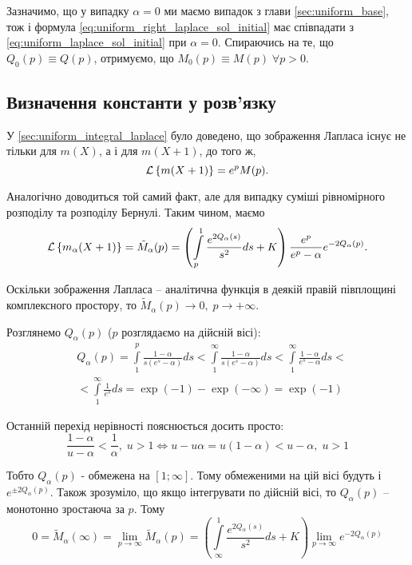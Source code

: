 Зазначимо, що у випадку $\alpha=0$ ми маємо випадок з глави \ref{sec:uniform_base}, тож і формула \eqref{eq:uniform_right_laplace_sol_initial} має співпадати з \eqref{eq:uniform_laplace_sol_initial} при $\alpha = 0$. Спираючись на те, що $Q_0(p) \equiv Q(p)$, отримуємо, що $M_0(p) \equiv M(p) \; \forall p > 0$.

\subsection{Визначення константи у розв'язку}

У \ref{sec:uniform_integral_laplace} було доведено, що зображення Лапласа існує не тільки для $m(X)$, а і для $m(X+1)$, до того ж,
\begin{equation}
	\mathcal{L}\left\{m(X+1)\right\} = e^p M(p).
\end{equation}

Аналогічно доводиться той самий факт, але для випадку суміші рівномірного розподілу та розподілу Бернулі. Таким чином, маємо
\begin{equation}
	\mathcal{L}\left\{m_\alpha(X+1)\right\} =\tilde M_\alpha(p)= \left( \int\limits_p^1 \frac{e^{2Q_\alpha(s)}}{s^2} ds + K \right) \frac{e^p}{e^p - \alpha} e^{- 2Q_\alpha(p)}.
\end{equation}

Оскільки зображення Лапласа – аналітична функція в деякій правій півплощині комплексного простору, то $\tilde M_\alpha(p) \rightarrow 0,\; p \rightarrow +\infty$.

Розглянемо $Q_\alpha(p)$ ($p$ розглядаємо на дійсній вісі):
\begin{equation}
\begin{split}
	\label{eq:q_alpha_p_major}
	&Q_\alpha(p) = \int\limits_1^p \frac{1-\alpha}{s(e^s - \alpha)} ds <  \int\limits_1^\infty \frac{1 - \alpha}{s(e^s - \alpha)} ds < 
	\int\limits_1^\infty \frac{1- \alpha}{e^s - \alpha} ds<\\
	&< \int\limits_1^\infty \frac{1}{e^s} ds = \exp(-1) - \exp(-\infty) = \exp(-1)
\end{split}
\end{equation}

Останній перехід нерівності пояснюється досить просто:
$$
\frac{1-\alpha}{u - \alpha} < \frac{1}{\alpha}, \; u > 1 \Leftrightarrow u - u \alpha = u(1-\alpha) < u - \alpha, \; u > 1
$$

Тобто $Q_\alpha(p)$ - обмежена на $[1; \infty]$. Тому обмеженими на цій вісі будуть і $e^{\pm 2Q_\alpha(p)}$. Також зрозуміло, що якщо інтегрувати по дійсній вісі, то $Q_\alpha(p)$ – монотонно зростаюча за $p$. Тому
\begin{equation}
	0 = \tilde M_\alpha(\infty) = \lim_{p\rightarrow \infty} \tilde M_\alpha(p) = \left( \int\limits_\infty^1 \frac{e^{2Q_\alpha(s)}}{s^2} ds + K \right) \lim_{p\rightarrow \infty} e^{- 2Q_\alpha(p)}
\end{equation}

